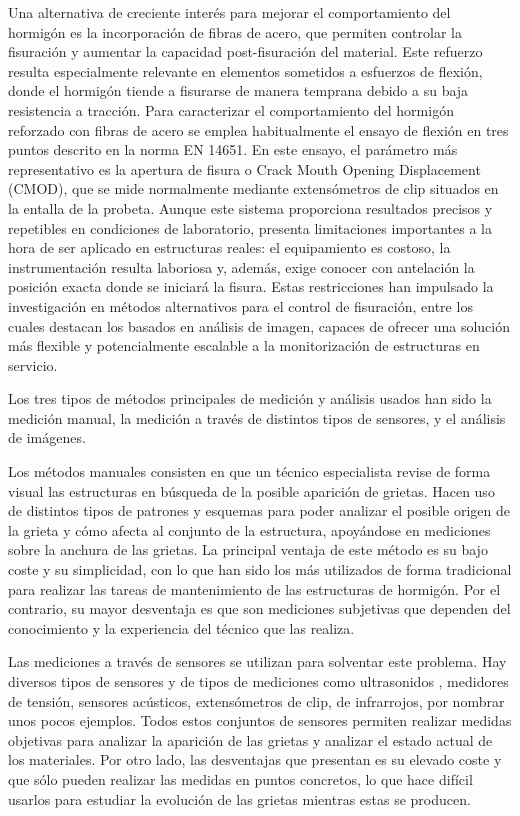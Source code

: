 Una alternativa de creciente interés para mejorar el comportamiento del hormigón es la incorporación de fibras de acero, que permiten controlar la fisuración y aumentar la capacidad post-fisuración del material. Este refuerzo resulta especialmente relevante en elementos sometidos a esfuerzos de flexión, donde el hormigón tiende a fisurarse de manera temprana debido a su baja resistencia a tracción. Para caracterizar el comportamiento del hormigón reforzado con fibras de acero se emplea habitualmente el ensayo de flexión en tres puntos descrito en la norma EN 14651. En este ensayo, el parámetro más representativo es la apertura de fisura o Crack Mouth Opening Displacement (CMOD), que se mide normalmente mediante extensómetros de clip situados en la entalla de la probeta. Aunque este sistema proporciona resultados precisos y repetibles en condiciones de laboratorio, presenta limitaciones importantes a la hora de ser aplicado en estructuras reales: el equipamiento es costoso, la instrumentación resulta laboriosa y, además, exige conocer con antelación la posición exacta donde se iniciará la fisura. Estas restricciones han impulsado la investigación en métodos alternativos para el control de fisuración, entre los cuales destacan los basados en análisis de imagen, capaces de ofrecer una solución más flexible y potencialmente escalable a la monitorización de estructuras en servicio.

Los tres tipos de métodos principales de medición y análisis usados han sido \cite{MenaAlonso2023} la medición manual, la medición a través de distintos tipos de sensores, y el análisis de imágenes.

Los métodos manuales consisten en que un técnico especialista revise de forma visual las estructuras en búsqueda de la posible aparición de grietas. Hacen uso de distintos tipos de patrones y esquemas para poder analizar el posible origen de la grieta y cómo afecta al conjunto de la estructura, apoyándose en mediciones sobre la anchura de las grietas. La principal ventaja de este método es su bajo coste y su simplicidad, con lo que han sido los más utilizados de forma tradicional para realizar las tareas de mantenimiento de las estructuras de hormigón. Por el contrario, su mayor desventaja es que son mediciones subjetivas que dependen del conocimiento y la experiencia del técnico que las realiza.

Las mediciones a través de sensores se utilizan para solventar este problema. Hay diversos tipos de sensores y de tipos de mediciones como ultrasonidos \cite{Lootens2020Continuous}, medidores de tensión, sensores acústicos, extensómetros de clip, de infrarrojos, por nombrar unos pocos ejemplos. Todos estos conjuntos de sensores permiten realizar medidas objetivas para analizar la aparición de las grietas y analizar el estado actual de los materiales. Por otro lado, las desventajas que presentan es su elevado coste y que sólo pueden realizar las medidas en puntos concretos, lo que hace difícil usarlos para estudiar la evolución de las grietas mientras estas se producen.

